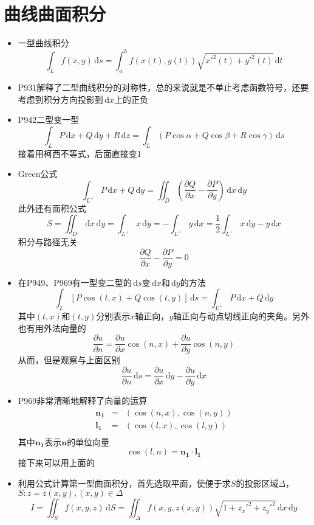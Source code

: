 \documentclass[UTF8]{ctexart}
\newcommand{\ud}{\,\mathrm{d}}
\begin{document}
\section{曲线曲面积分}
\begin{itemize}

\item 一型曲线积分
\[
\int_L f(x,y)\ud s = \int_a^b f(x(t),y(t))\sqrt{x'^2(t)+y'^2(t)}\ud t
\]

\item P931解释了二型曲线积分的对称性，总的来说就是不单止考虑函数符号，还要考虑到积分方向投影到$\ud x$上的正负

\item P942二型变一型
\[
\int_L P\ud x+ Q\ud y+ R\ud z = \int_L (P\cos\alpha + Q\cos \beta + R\cos \gamma)\ud s
\]
接着用柯西不等式，后面直接变1

\item Green公式
\[
\int_{L^+} P\ud x+ Q\ud y = \iint_D (\frac{\partial Q}{\partial x}-\frac{\partial P}{\partial y})\ud x \ud y
\]
此外还有面积公式
\[
S = \iint_D\ud x\ud y = \int_{L^+}x\ud y = - \int_{L^+}y\ud x = \frac{1}{2} \int_{L^+}x\ud y-y\ud x
\]
积分与路径无关
\[
\frac{\partial Q}{\partial x}-\frac{\partial P}{\partial y} = 0
\]

\item 在P949、P969有一型变二型的$\ud s$变$\ud{x}$和$\ud{y}$的方法
\[
\int_L [P\cos(t,x) + Q\cos(t,y)] \ud s = \int_{L^+} P\ud x+ Q\ud y 
\]
其中$(t,x)$和$(t,y)$分别表示$x$轴正向，$y$轴正向与动点切线正向的夹角。另外也有用外法向量的
\[
\frac{\partial u}{\partial n} = \frac{\partial u}{\partial x}\cos(n,x)+\frac{\partial u}{\partial y}\cos(n,y)
\]
从而，但是观察与上面区别
\[
\frac{\partial u}{\partial n} \ud s = \frac{\partial u}{\partial x} \ud y - \frac{\partial u}{\partial y} \ud x
\]
\item P969非常清晰地解释了向量的运算
\begin{eqnarray*}
\mathbf{n_1} &=& (\cos(n,x),\cos(n,y))\\
\mathbf{l_1} &=& (\cos(l,x),\cos(l,y))\\
\end{eqnarray*}
其中$\mathbf{n_1}$表示$\mathbf{n}$的单位向量
\[
\cos(l,n) = \mathbf{n_1}\cdot \mathbf{l_1}
\]
接下来可以用上面的

\item 利用公式计算第一型曲面积分，首先选取平面，使便于求$S$的投影区域$\Delta$，$S:z=z(x,y),(x,y)\in \Delta$
\[
I = \iint_S f(x,y,z)\ud S = \iint_\Delta f(x,y,z(x,y))\sqrt{1+z_x'^2+z_y'^2}\ud x\ud y
\]


\end{itemize}
\end{document}
